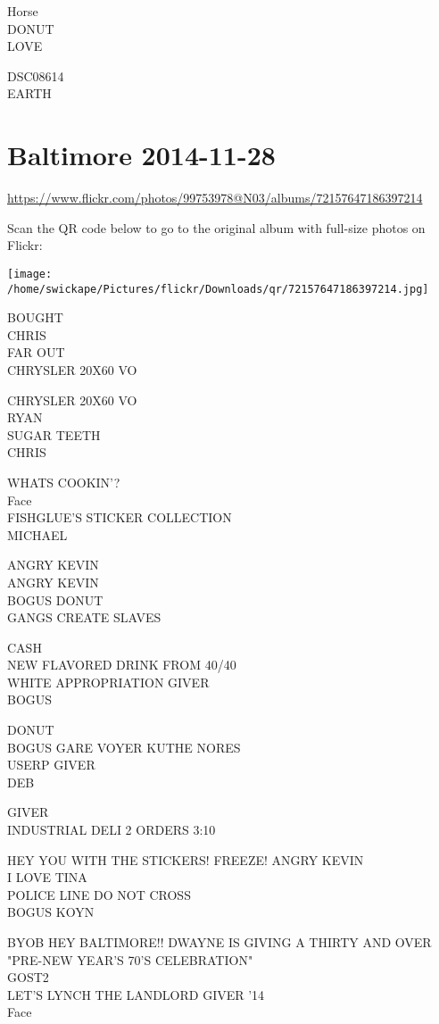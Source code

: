 \documentclass[10pt,letterpaper]{article}
\begin{document}
Horse\\
DONUT\\
LOVE

DSC08614\\
EARTH
\pagebreak

\section*{Baltimore 2014-11-28}

\url{https://www.flickr.com/photos/99753978@N03/albums/72157647186397214}

Scan the QR code below to go to the original album with full-size photos on Flickr:

\texttt{[image: /home/swickape/Pictures/flickr/Downloads/qr/72157647186397214.jpg]}
\pagebreak

BOUGHT\\
CHRIS\\
FAR OUT\\
CHRYSLER 20X60 VO

CHRYSLER 20X60 VO\\
RYAN\\
SUGAR TEETH\\
CHRIS

WHATS COOKIN'?\\
Face\\
FISHGLUE'S STICKER COLLECTION\\
MICHAEL

ANGRY KEVIN\\
ANGRY KEVIN\\
BOGUS DONUT\\
GANGS CREATE SLAVES

CASH\\
NEW FLAVORED DRINK FROM 40/40\\
WHITE APPROPRIATION GIVER\\
BOGUS

DONUT\\
BOGUS GARE VOYER KUTHE NORES\\
USERP GIVER\\
DEB

GIVER\\
INDUSTRIAL DELI 2 ORDERS 3:10

HEY YOU WITH THE STICKERS!  FREEZE!  ANGRY KEVIN\\
I LOVE TINA\\
POLICE LINE DO NOT CROSS\\
BOGUS KOYN

BYOB HEY BALTIMORE!! DWAYNE IS GIVING A THIRTY AND OVER "PRE{-}NEW YEAR'S 70'S CELEBRATION"\\
GOST2\\
LET'S LYNCH THE LANDLORD GIVER '14\\
Face
\end{document}
